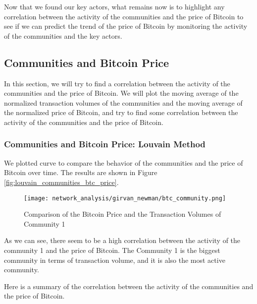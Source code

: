 \documentclass[a4paper, 12pt]{article}
\begin{document}
Now that we found our key actors, what remains now is to highlight any correlation between the activity of the communities 
and the price of Bitcoin to see if we can predict the trend of the price of Bitcoin by monitoring the activity of the communities
and the key actors. 

\newpage

\subsection{Communities and Bitcoin Price}

In this section, we will try to find a correlation between the activity of the communities and the price of Bitcoin.
We will plot the moving average of the normalized transaction volumes of the communities and the moving average of the normalized price of Bitcoin,
and try to find some correlation between the activity of the communities and the price of Bitcoin.

\subsubsection{Communities and Bitcoin Price: Louvain Method}

We plotted curve to compare the behavior of the communities and the price of Bitcoin over time. 
The results are shown in Figure \ref{fig:louvain_communities_btc_price}.

\begin{figure}[h]
    \centering
    \texttt{[image: network\_analysis/girvan\_newman/btc\_community.png]}
    \caption{Comparison of the Bitcoin Price and the Transaction Volumes of Community 1}
    \label{fig:enter-label}
\end{figure}

As we can see, there seem to be a high correlation between the activity of the community 1 and the price of Bitcoin. The Community 1 
is the biggest community in terms of transaction volume, and it is also the most active community. 

Here is a summary of the correlation between the activity of the communities and the price of Bitcoin.
\end{document}
